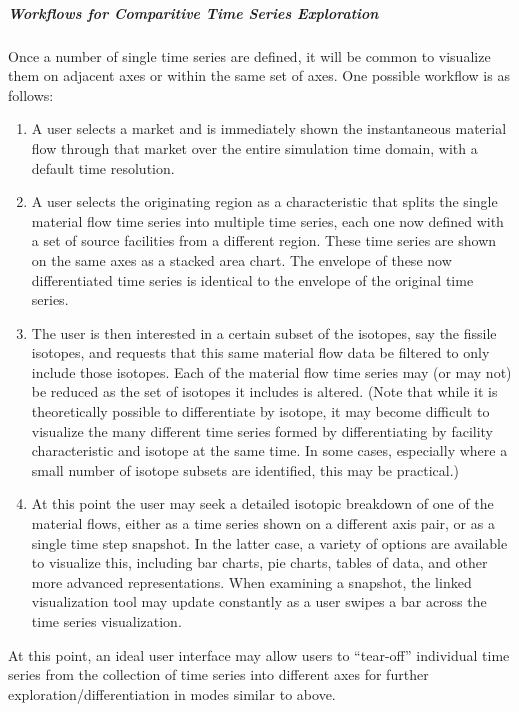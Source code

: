 \documentclass[letterpaper,10pt,english]{sphinxmanual}
\begin{document}
\subparagraph{Workflows for Comparitive Time Series Exploration}
\label{devdoc/output_usecases:workflows-for-comparitive-time-series-exploration}
Once a number of single time series are defined, it will be common to
visualize them on adjacent axes or within the same set of axes.  One
possible workflow is as follows:
\begin{enumerate}
\item {} 
A user selects a market and is immediately shown the
instantaneous material flow through that market over the entire
simulation time domain, with a default time resolution.

\item {} 
A user selects the originating region as a characteristic that
splits the single material flow time series into multiple time
series, each one now defined with a set of source facilities
from a different region.  These time series are shown on the
same axes as a stacked area chart.  The envelope of these now
differentiated time series is identical to the envelope of the
original time series.

\item {} 
The user is then interested in a certain subset of the isotopes,
say the fissile isotopes, and requests that this same material
flow data be filtered to only include those isotopes.  Each of
the material flow time series may (or may not) be reduced as the
set of isotopes it includes is altered.  (Note that while it is
theoretically possible to differentiate by isotope, it may
become difficult to visualize the many different time series
formed by differentiating by facility characteristic and isotope
at the same time.  In some cases, especially where a small
number of isotope subsets are identified, this may be
practical.)

\item {} 
At this point the user may seek a detailed isotopic breakdown of
one of the material flows, either as a time series shown on a
different axis pair, or as a single time step snapshot.  In the
latter case, a variety of options are available to visualize
this, including bar charts, pie charts, tables of data, and
other more advanced representations.  When examining a snapshot,
the linked visualization tool may update constantly as a user
swipes a bar across the time series visualization.

\end{enumerate}

At this point, an ideal user interface may allow users to ``tear-off''
individual time series from the collection of time series into
different axes for further exploration/differentiation in modes
similar to above.
\end{document}

